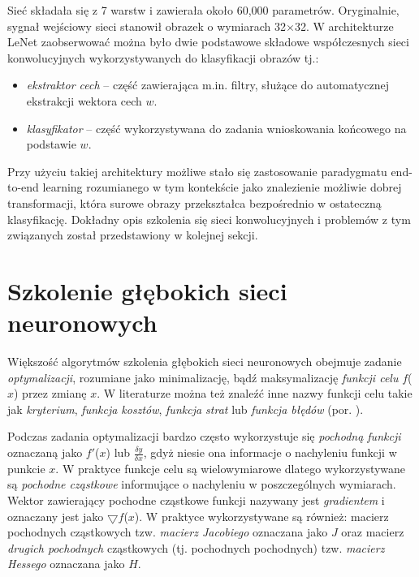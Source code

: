 Sieć składała się z 7 warstw i zawierała około 60,000 parametrów. Oryginalnie, sygnał wejściowy sieci stanowił obrazek o wymiarach 32$\times$32. W architekturze LeNet zaobserwować można było dwie podstawowe składowe współczesnych sieci konwolucyjnych wykorzystywanych do klasyfikacji obrazów tj.:
\begin{itemize}
	\item \textit{ekstraktor cech} -- część zawierająca m.in. filtry, służące do automatycznej ekstrakcji wektora cech $w$.
	\item \textit{klasyfikator} -- część wykorzystywana do zadania wnioskowania końcowego na podstawie $w$.
\end{itemize}  

Przy użyciu takiej architektury możliwe stało się zastosowanie paradygmatu end-to-end learning rozumianego w tym kontekście jako znalezienie możliwie dobrej transformacji, która surowe obrazy przekształca bezpośrednio w ostateczną klasyfikację. Dokładny opis szkolenia się sieci konwolucyjnych i problemów z tym związanych został przedstawiony w kolejnej sekcji.  

\section{Szkolenie głębokich sieci neuronowych}

Większość algorytmów szkolenia głębokich sieci neuronowych obejmuje zadanie \textit{optymalizacji}, rozumiane jako minimalizację, bądź maksymalizację \textit{funkcji celu} $f$($x$) przez zmianę $x$. W literaturze można też znaleźć inne nazwy funkcji celu takie jak \textit{kryterium}, \textit{funkcja kosztów}, \textit{funkcja strat} lub \textit{funkcja błędów} (por. \cite{Goodfellow-et-al-2016}). 

Podczas zadania optymalizacji bardzo często wykorzystuje się \textit{pochodną funkcji} oznaczaną jako $f'$($x$) lub $\frac{\delta y}{\delta x}$, gdyż niesie ona informacje o nachyleniu funkcji w punkcie $x$. W praktyce funkcje celu są wielowymiarowe dlatego wykorzystywane są \textit{pochodne cząstkowe} informujące o nachyleniu w poszczególnych wymiarach. Wektor zawierający pochodne cząstkowe funkcji nazywany jest \textit{gradientem} i oznaczany jest jako $\bigtriangledown f$($x$). W praktyce wykorzystywane są również: macierz pochodnych cząstkowych tzw. \textit{macierz Jacobiego} oznaczana jako $J$ oraz macierz \textit{drugich pochodnych} cząstkowych (tj. pochodnych pochodnych) tzw. \textit{macierz Hessego} oznaczana jako $H$.

